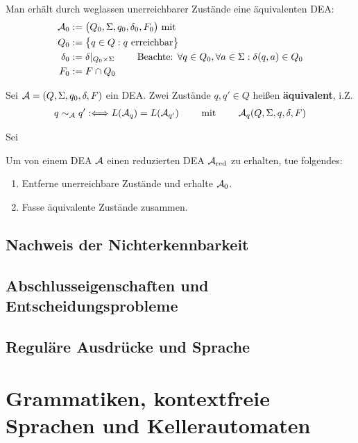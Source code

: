 Man erhält durch weglassen unerreichbarer Zustände eine äquivalenten DEA:
\begin{align*}
	\mathcal{A}_0&:=\big(Q_0,\Sigma,q_0,\delta_0,F_0\big)\text{ mit }\\
	Q_0&:=\big\lbrace q\in Q:q\text{ erreichbar}\big\rbrace\\
	\delta_0&:=\delta|_{Q_0\times\Sigma}\qquad\text{ Beachte: }\forall q\in Q_0,\forall a\in\Sigma:\delta(q,a)\in Q_0\\
	F_0&:=F\cap Q_0
\end{align*}

\begin{definition}\label{def2.8}
	Sei $\mathcal{A}=(Q,\Sigma,q_0,\delta,F)$ ein DEA.
	Zwei Zustände $q,q'\in Q$ heißen \textbf{äquivalent}, i.Z.
	\begin{align*}
		q\sim_{\mathcal{A}} q':\Longleftrightarrow L(\mathcal{A}_q)=L(\mathcal{A}_{q'})
		\qquad\text{ mit }\qquad
		\mathcal{A}_q(Q,\Sigma,q,\delta,F)
	\end{align*}
\end{definition}

\begin{lemma}\label{lemma2.8}
	Sei %
\end{lemma}

Um von einem DEA $\mathcal{A}$ einen reduzierten DEA $\mathcal{A}_{\text{red}}$ zu erhalten, tue folgendes:
\begin{enumerate}
	\item Entferne unerreichbare Zustände und erhalte $\mathcal{A}_0$.
	\item Fasse äquivalente Zustände zusammen.
\end{enumerate}

\subsection{Nachweis der Nichterkennbarkeit}

\subsection{Abschlusseigenschaften und Entscheidungsprobleme}

\subsection{Reguläre Ausdrücke und Sprache}

\section{Grammatiken, kontextfreie Sprachen und Kellerautomaten}
